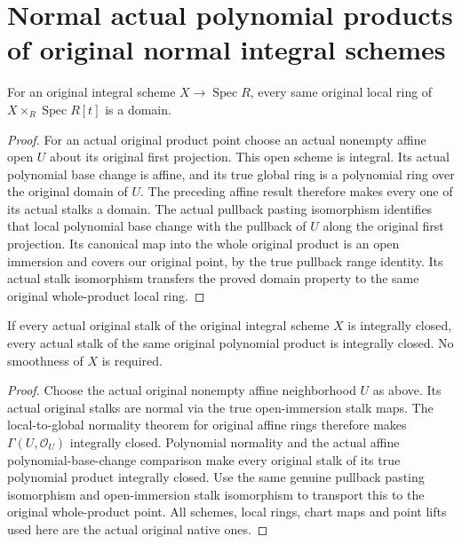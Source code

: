 \section{Normal actual polynomial products of original normal integral schemes}

\begin{theorem}
\label{thm:actual-polynomial-product-domain-stalks}
\leanok
{}
For an original integral scheme $X\to\operatorname{Spec}R$, every same original
local ring of $X\times_R\operatorname{Spec}R[t]$ is a domain.
\end{theorem}
\begin{proof}
For an actual original product point choose an actual nonempty affine open
$U$ about its original first projection. This open scheme is integral. Its
actual polynomial base change is affine, and its true global ring is a
polynomial ring over the original domain of $U$. The preceding affine result
therefore makes every one of its actual stalks a domain. The actual pullback
pasting isomorphism identifies that local polynomial base change with the
pullback of $U$ along the original first projection. Its canonical map into
the whole original product is an open immersion and covers our original point,
by the true pullback range identity. Its actual stalk isomorphism transfers
the proved domain property to the same original whole-product local ring.
\end{proof}

\begin{theorem}
\label{thm:actual-polynomial-product-normal-stalks}
\leanok
{}
If every actual original stalk of the original integral scheme $X$ is
integrally closed, every actual stalk of the same original polynomial product
is integrally closed. No smoothness of $X$ is required.
\end{theorem}
\begin{proof}
Choose the actual original nonempty affine neighborhood $U$ as above. Its
actual original stalks are normal via the true open-immersion stalk maps.
The local-to-global normality theorem for original affine rings therefore
makes $\Gamma(U,\mathcal O_U)$ integrally closed. Polynomial normality and
the actual affine polynomial-base-change comparison make every original
stalk of its true polynomial product integrally closed. Use the same genuine
pullback pasting isomorphism and open-immersion stalk isomorphism to transport
this to the original whole-product point. All schemes, local rings, chart
maps and point lifts used here are the actual original native ones.
\end{proof}
